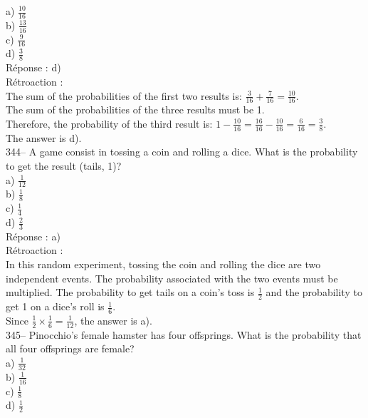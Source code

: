 \documentclass[letterpaper, 12pt]{article}
\begin{document}
a) $\frac{10}{16}$\\[2mm]
b) $\frac{13}{16}$\\[2mm]
c) $\frac{9}{16}$\\[2mm]
d) $\frac{3}{8}$\\

R\'eponse : d)\\

R\'etroaction : \\
The sum of the probabilities of the first two results is:
$\frac{3}{16}+\frac{7}{16}=\frac{10}{16}$.\\[2mm]
The sum of the probabilities of the three results must be 1.\\[2mm]
Therefore, the probability of the third result is:
$1-\frac{10}{16}=\frac{16}{16}-\frac{10}{16}=\frac{6}{16}=\frac{3}{8}.$\\[2mm]
The answer is d).\\

344-- A game consist in tossing a coin and rolling a dice. What is the probability to get the result (tails, 1)?\\

a) $\frac{1}{12}$\\[2mm]
b) $\frac{1}{8}$\\[2mm]
c) $\frac{1}{4}$\\[2mm]
d) $\frac{2}{3}$\\[2mm]

R\'eponse : a)\\

R\'etroaction : \\
In this random experiment, tossing the coin and rolling the dice are two independent events. The probability associated with the two events must be multiplied.
The probability to get tails on a coin's toss is $\frac{1}{2}$ and the probability to get 1 on a dice's roll is $\frac{1}{6}$.\\[2mm]
Since $\frac{1}{2}\times \frac{1}{6}=\frac{1}{12}$, the answer is a).\\

345-- Pinocchio's female hamster has four offsprings. What is the probability that all four offsprings are female?\\

a) $\frac{1}{32}$\\[2mm]
b) $\frac{1}{16}$\\[2mm]
c) $\frac{1}{8}$\\[2mm]
d) $\frac{1}{2}$\\
\end{document}
